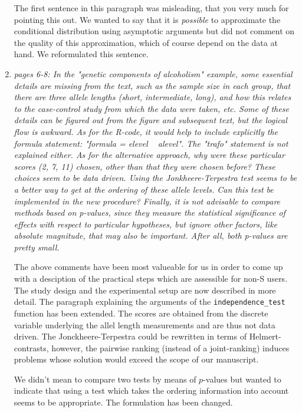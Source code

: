 \documentclass[11pt]{article}
\begin{document}
\begin{enumerate}
The first sentence in this paragraph was misleading, that you very much for
pointing this out. We wanted to say that it is \textit{possible} to
approximate the conditional distribution using asymptotic arguments but did
not comment on the quality of this approximation, which of course depend on
the data at hand. We reformulated this sentence.

\item \textsl{pages 6-8:  In the "genetic components of alcoholism" example, some essential details are 
              missing from the text, such as the sample size in each group, that there are three allele 
              lengths (short, intermediate, long), and how this relates to the case-control study from 
              which the data were taken, etc. Some of these details can be figured out from the figure 
              and subsequent text, but the logical flow is awkward.  As for the R-code, it would help 
              to include explicitly the formula statement: "formula = elevel ~ alevel". The "trafo" 
              statement is not explained either.  As for the alternative approach, why were these 
              particular scores (2, 7, 11) chosen, other than that they were chosen before? 
              These choices seem to be data driven. 
              Using the Jonkheere-Terpestra test seems to be a better way to get at the ordering of 
              these allele levels. Can this test be implemented in the new procedure? 
              Finally, it is not advisable to compare methods based on p-values, since they measure 
              the statistical significance of effects with respect to particular hypotheses, but 
              ignore other factors, like absolute magnitude, that may also be important. After all, 
              both p-values are pretty small.}

The above comments have been most valueable for us in order to come up with
a desciption of the practical steps which are assessible for non-\textsf{S}
users. The study design and the experimental setup are now described in more
detail. The paragraph explaining the arguments of the
\texttt{independence\_test} function has been extended. The scores are
obtained from the discrete variable underlying the allel length measurements
and are thus not data driven. The Jonckheere-Terpestra could be rewritten in
terms of Helmert-contrasts, however, the pairwise ranking (instead of a
joint-ranking) induces problems whose solution would exceed the scope of
our manuscript.

We didn't mean to compare two tests by means of $p$-values but wanted to
indicate that using a test which takes the ordering information into account
seems to be appropriate. The formulation has been changed.


\end{enumerate}
\end{document}
